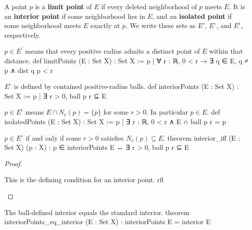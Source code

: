 \begin{definition} \label{an1:def:limit-interior-isolated-points}
  A point $p$ is a \textbf{limit point} of $E$ if every deleted neighborhood of $p$ meets $E$.
  It is an \textbf{interior point} if some neighborhood lies in $E$, and an \textbf{isolated point} if some neighborhood meets $E$ exactly at $p$.
  We write these sets as $E'$, $E^{\circ}$, and $E^{i}$, respectively.
  \begin{lean}{$p\in E^{\prime}$ means that every positive radius admits a distinct point of $E$ within that distance.}
    def limitPoints (E : Set X) : Set X :=
      {p | ∀ r : ℝ, 0 < r → ∃ q ∈ E, q ≠ p ∧ dist q p < r}
  \end{lean}
  \begin{lean}{$E^{\circ}$ is defined by contained positive-radius balls.}
    def interiorPoints (E : Set X) : Set X :=
      {p | ∃ r > 0, ball p r ⊆ E}
  \end{lean}
  \begin{lean}{$p\in E^{i}$ means $E\cap N_r(p)=\{p\}$ for some $r>0$. In particular $p\in E$.}
    def isolatedPoints (E : Set X) : Set X :=
      {p | ∃ r : ℝ, 0 < r ∧ E ∩ ball p r = {p}}
  \end{lean}
\end{definition}

\begin{lemma} \label{an1:lem:interior-iff}
  \begin{lean}{$p\in E^{\circ}$ if and only if some $r>0$ satisfies $N_r(p)\subseteq E$.}
    theorem interior_iff (E : Set X) (p : X) :
        p ∈ interiorPoints E ↔ ∃ r > 0, ball p r ⊆ E
  \end{lean}
\end{lemma}

\begin{proof}
  \begin{lean}{This is the defining condition for an interior point.}
    rfl
  \end{lean}

\end{proof}

\begin{lemma} \label{an1:lem:interiorPoints-eq-interior}
  \begin{lean}{The ball-defined interior equals the standard interior.}
    theorem interiorPoints_eq_interior (E : Set X) : interiorPoints E = interior E
  \end{lean}
\end{lemma}

